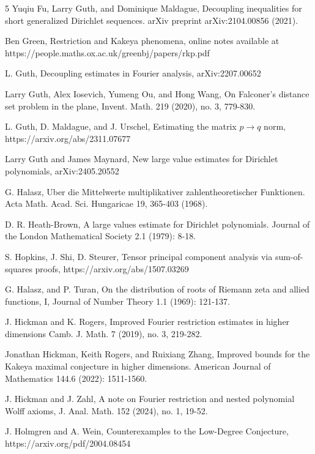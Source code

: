 \documentclass{amsart}
\begin{document}
\begin{thebibliography}{5}
 Yuqiu Fu, Larry Guth, and Dominique Maldague,  Decoupling inequalities for short generalized Dirichlet sequences.  arXiv preprint arXiv:2104.00856 (2021).

 Ben Green, Restriction and Kakeya phenomena, online notes available at https://people.maths.ox.ac.uk/greenbj/papers/rkp.pdf

 L. Guth, Decoupling estimates in Fourier analysis, arXiv:2207.00652

 Larry Guth, Alex Iosevich, Yumeng Ou, and Hong Wang, On Falconer's distance set problem in the plane, 
Invent. Math. 219 (2020), no. 3, 779-830.

  L. Guth,  D. Maldague, and J. Urschel,  Estimating the matrix $p \rightarrow q$ norm,  https://arxiv.org/abs/2311.07677

 Larry Guth and James Maynard,  New large value estimates for Dirichlet polynomials, arXiv:2405.20552 

 G. Halasz, Uber die Mittelwerte multiplikativer zahlentheoretischer Funktionen. Acta Math. Acad. Sci. Hungaricae 19, 365-403 (1968).

 D. R. Heath-Brown, A large values estimate for Dirichlet polynomials. Journal of the London
Mathematical Society 2.1 (1979): 8-18.

 S. Hopkins,  J. Shi, D. Steurer,  Tensor principal component analysis via sum-of-squares proofs,  https://arxiv.org/abs/1507.03269

 G. Halasz,  and P.  Turan, On the distribution of roots of Riemann zeta and allied functions, I,  Journal of Number Theory 1.1 (1969): 121-137.

 J. Hickman and K. Rogers,  Improved Fourier restriction estimates in higher dimensions
Camb. J. Math. 7 (2019), no. 3, 219-282.

 Jonathan Hickman, Keith Rogers, and Ruixiang Zhang,  Improved bounds for the Kakeya maximal conjecture in higher dimensions. American Journal of Mathematics 144.6 (2022): 1511-1560.

 J. Hickman and J. Zahl,   A note on Fourier restriction and nested polynomial Wolff axioms,  
J. Anal. Math. 152 (2024), no. 1, 19-52.

 J. Holmgren and A. Wein,  Counterexamples to the Low-Degree Conjecture,  https://arxiv.org/pdf/2004.08454


\end{thebibliography}
\end{document}
